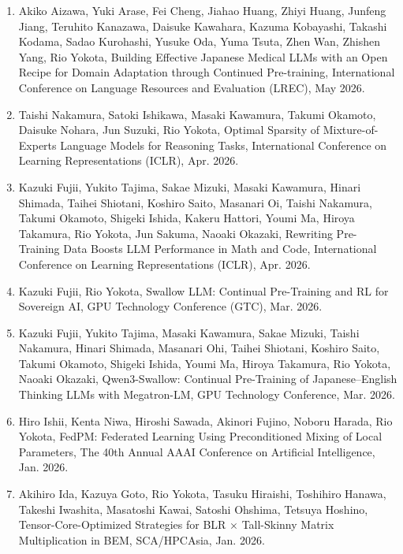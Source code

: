 \documentclass[margin,line]{cv}
\begin{document}
\begin{resume}
\begin{enumerate}
\item Akiko Aizawa, Yuki Arase, Fei Cheng, Jiahao Huang, Zhiyi Huang, Junfeng Jiang, Teruhito Kanazawa, Daisuke Kawahara, Kazuma Kobayashi, Takashi Kodama, Sadao Kurohashi, Yusuke Oda, Yuma Tsuta, Zhen Wan, Zhishen Yang, Rio Yokota, Building Effective Japanese Medical LLMs with an Open Recipe for Domain Adaptation through Continued Pre-training, International Conference on Language Resources and Evaluation (LREC), May 2026.

\item Taishi Nakamura, Satoki Ishikawa, Masaki Kawamura, Takumi Okamoto, Daisuke Nohara, Jun Suzuki, Rio Yokota, Optimal Sparsity of Mixture-of-Experts Language Models for Reasoning Tasks, International Conference on Learning Representations (ICLR), Apr. 2026.

\item Kazuki Fujii, Yukito Tajima, Sakae Mizuki, Masaki Kawamura, Hinari Shimada, Taihei Shiotani, Koshiro Saito, Masanari Oi, Taishi Nakamura, Takumi Okamoto, Shigeki Ishida, Kakeru Hattori, Youmi Ma, Hiroya Takamura, Rio Yokota, Jun Sakuma, Naoaki Okazaki, Rewriting Pre-Training Data Boosts LLM Performance in Math and Code, International Conference on Learning Representations (ICLR), Apr. 2026.

\item Kazuki Fujii, Rio Yokota, Swallow LLM: Continual Pre-Training and RL for Sovereign AI, GPU Technology Conference (GTC), Mar. 2026.

\item Kazuki Fujii, Yukito Tajima, Masaki Kawamura, Sakae Mizuki, Taishi Nakamura, Hinari Shimada, Masanari Ohi, Taihei Shiotani, Koshiro Saito, Takumi Okamoto, Shigeki Ishida, Youmi Ma, Hiroya Takamura, Rio Yokota, Naoaki Okazaki, Qwen3-Swallow: Continual Pre-Training of Japanese--English Thinking LLMs with Megatron-LM, GPU Technology Conference, Mar. 2026.

\item Hiro Ishii, Kenta Niwa, Hiroshi Sawada, Akinori Fujino, Noboru Harada, Rio Yokota, FedPM: Federated Learning Using Preconditioned Mixing of Local Parameters, The 40th Annual AAAI Conference on Artificial Intelligence, Jan. 2026.

\item Akihiro Ida, Kazuya Goto, Rio Yokota, Tasuku Hiraishi, Toshihiro Hanawa, Takeshi Iwashita, Masatoshi Kawai, Satoshi Ohshima, Tetsuya Hoshino, Tensor-Core-Optimized Strategies for BLR $\times$ Tall-Skinny Matrix Multiplication in BEM, SCA/HPCAsia, Jan. 2026.


\end{enumerate}
\end{resume}
\end{document}
